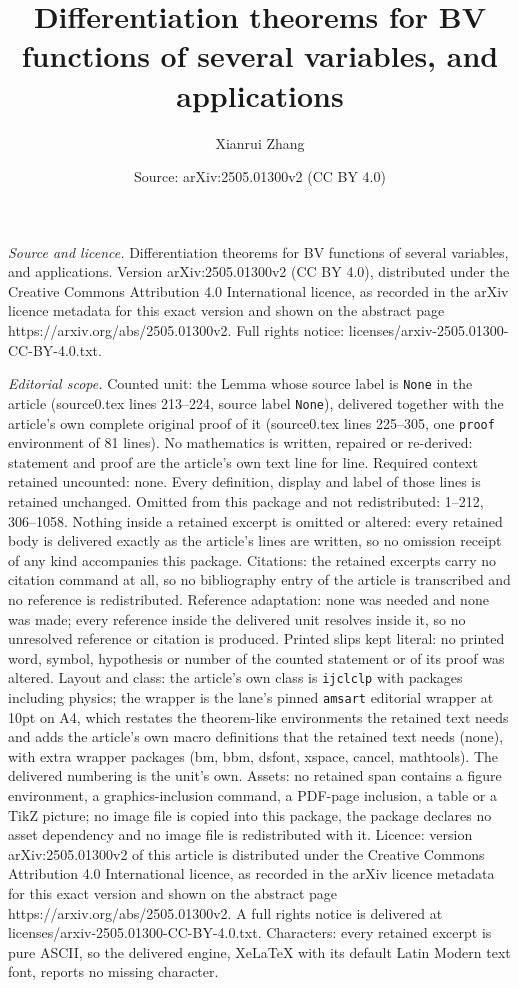 \documentclass[10pt,a4paper]{amsart}
\title[Differentiation theorems for BV functions of several variabl]{Differentiation theorems for BV functions of several variables, and applications}
\author{Xianrui Zhang}
\date{Source: arXiv:2505.01300v2 (CC BY 4.0)}
\begin{document}
\maketitle

\noindent\emph{Source and licence.} Differentiation theorems for BV functions of several variables, and applications. Version arXiv:2505.01300v2 (CC BY 4.0), distributed under the Creative Commons Attribution 4.0 International licence, as recorded in the arXiv licence metadata for this exact version and shown on the abstract page https://arxiv.org/abs/2505.01300v2. Full rights notice: licenses/arxiv-2505.01300-CC-BY-4.0.txt.\par\smallskip

\noindent\textit{Editorial scope.} Counted unit: the Lemma whose source label is \texttt{None} in the article (source0.tex lines 213--224, source label \texttt{None}), delivered together with the article's own complete original proof of it (source0.tex lines 225--305, one \texttt{proof} environment of 81 lines). No mathematics is written, repaired or re-derived: statement and proof are the article's own text line for line. Required context retained uncounted: none. Every definition, display and label of those lines is retained unchanged. Omitted from this package and not redistributed: 1--212, 306--1058. Nothing inside a retained excerpt is omitted or altered: every retained body is delivered exactly as the article's lines are written, so no omission receipt of any kind accompanies this package. Citations: the retained excerpts carry no citation command at all, so no bibliography entry of the article is transcribed and no reference is redistributed. Reference adaptation: none was needed and none was made; every reference inside the delivered unit resolves inside it, so no unresolved reference or citation is produced. Printed slips kept literal: no printed word, symbol, hypothesis or number of the counted statement or of its proof was altered. Layout and class: the article's own class is \texttt{ijclclp} with packages including physics; the wrapper is the lane's pinned \texttt{amsart} editorial wrapper at 10pt on A4, which restates the theorem-like environments the retained text needs and adds the article's own macro definitions that the retained text needs (none), with extra wrapper packages (bm, bbm, dsfont, xspace, cancel, mathtools). The delivered numbering is the unit's own. Assets: no retained span contains a figure environment, a graphics-inclusion command, a PDF-page inclusion, a table or a TikZ picture; no image file is copied into this package, the package declares no asset dependency and no image file is redistributed with it. Licence: version arXiv:2505.01300v2 of this article is distributed under the Creative Commons Attribution 4.0 International licence, as recorded in the arXiv licence metadata for this exact version and shown on the abstract page https://arxiv.org/abs/2505.01300v2. A full rights notice is delivered at licenses/arxiv-2505.01300-CC-BY-4.0.txt. Characters: every retained excerpt is pure ASCII, so the delivered engine, XeLaTeX with its default Latin Modern text font, reports no missing character.
\end{document}
